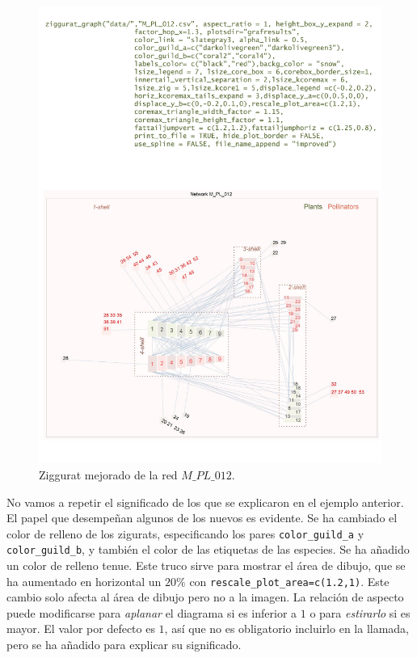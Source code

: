 \clearpage
\begin{figure}[hbt!]
\centering
\includegraphics[scale=0.8]{ManFigs/M_PL_012_ziggurat_improved.pdf}
\caption {Ziggurat mejorado de la red $M\_PL\_012$.}
\label{fig:AKMAN_ziggurat_012_improved}
\end{figure}

\clearpage
No vamos a repetir el significado de los que se explicaron en el ejemplo anterior. El papel que desempeñan algunos de los nuevos
es evidente. Se ha cambiado el color de relleno de los zigurats, especificando los pares \texttt{color\_guild\_a} y \texttt{color\_guild\_b},
y también el color de las etiquetas de las especies. Se ha añadido un color de relleno tenue. Este truco sirve para mostrar el área de dibujo, que se ha aumentado en horizontal un $20\%$ con \texttt{rescale\_plot\_area=c(1.2,1)}. Este cambio solo afecta al área de dibujo pero no a la imagen. La relación de aspecto puede modificarse para \textit{aplanar} el diagrama si es inferior a $1$ o para \textit{estirarlo} si es mayor. El valor por defecto es $1$, así que no es obligatorio incluirlo en la llamada, pero se ha añadido para explicar su significado.

